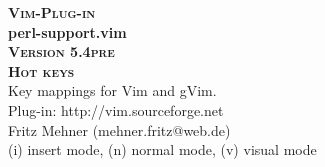 \documentclass[oneside,10pt,landscape,DIV17]{scrartcl}
\newcommand{\Pluginversion}{5.4pre}
\begin{document}
%

\begin{multicols}{3}
%
\begin{center}
%
\textbf{\textsc{\small{Vim-Plug-in}}}\\
\textbf{\LARGE{perl-support.vim}}\\
\textbf{\textsc{\small{Version \Pluginversion}}}\\
\vspace{5mm}%
\textbf{\textsc{\Huge{Hot keys}}}\\ 
\vspace{5mm}%
Key mappings for Vim and gVim.\\
Plug-in: http://vim.sourceforge.net\\
Fritz Mehner (mehner.fritz@web.de)\\
\vspace{1.0mm}
{\normalsize (i)} insert mode, {\normalsize (n)} normal mode, {\normalsize (v)} visual mode\\
\vspace{4.0mm}


\end{center}
\end{multicols}
\end{document}
